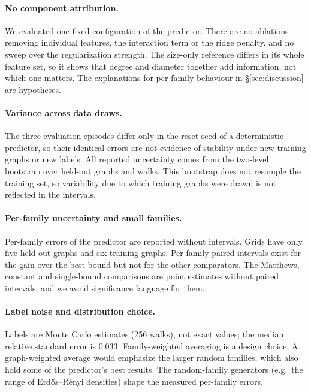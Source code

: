 \documentclass{article}
\begin{document}
\paragraph{No component attribution.} We evaluated one fixed configuration of the predictor. There are no ablations removing individual features, the interaction term or the ridge penalty, and no sweep over the regularization strength. The size-only reference differs in its whole feature set, so it shows that degree and diameter together add information, not which one matters. The explanations for per-family behaviour in \S\ref{sec:discussion} are hypotheses.

\paragraph{Variance across data draws.} The three evaluation episodes differ only in the reset seed of a deterministic predictor, so their identical errors are not evidence of stability under new training graphs or new labels. All reported uncertainty comes from the two-level bootstrap over held-out graphs and walks. This bootstrap does not resample the training set, so variability due to which training graphs were drawn is not reflected in the intervals.

\paragraph{Per-family uncertainty and small families.} Per-family errors of the predictor are reported without intervals. Grids have only five held-out graphs and six training graphs. Per-family paired intervals exist for the gain over the best bound but not for the other comparators. The Matthews, constant and single-bound comparisons are point estimates without paired intervals, and we avoid significance language for them.

\paragraph{Label noise and distribution choice.} Labels are Monte Carlo estimates (256 walks), not exact values; the median relative standard error is 0.033. Family-weighted averaging is a design choice. A graph-weighted average would emphasize the larger random families, which also hold some of the predictor's best results. The random-family generators (e.g.\ the range of Erd\H{o}s--R\'enyi densities) shape the measured per-family errors.
\end{document}
